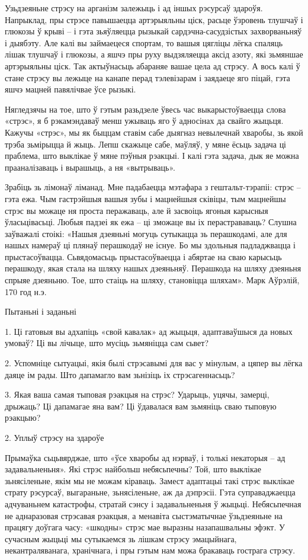 Узьдзеяньне стрэсу на арганізм залежыць і ад іншых рэсурсаў здароўя. Напрыклад, пры стрэсе павышаецца артэрыяльны ціск, расьце ўзровень тлушчаў і глюкозы ў крыві – і гэта зьяўляецца рызыкай сардэчна-сасудзістых захворваньняў і дыябэту. Але калі вы займаецеся спортам, то вашыя цягліцы лёгка спаляць лішак тлушчаў і глюкозы, а яшчэ пры руху выдзяляецца аксід азоту, які зьмяншае артэрыяльны ціск. Так актыўнасьць абараняе вашае цела ад стрэсу. А вось калі ў стане стрэсу вы лежыце на канапе перад тэлевізарам і заядаеце яго піцай, гэта яшчэ мацней павялічвае ўсе рызыкі.

Нягледзячы на тое, што ў гэтым разьдзеле ўвесь час выкарыстоўваецца слова «стрэс», я б рэкамэндаваў менш ужываць яго ў адносінах да свайго жыцьця. Кажучы «стрэс», мы як быццам ставім сабе дыягназ невылечнай хваробы, зь якой трэба зьмірыцца й жыць. Лепш скажыце сабе, маўляў, у мяне ёсьць задача ці праблема, што выклікае ў мяне пэўныя рэакцыі. І калі гэта задача, дык яе можна прааналізаваць і вырашыць, а ня «вытрываць».

Зрабіць зь лімонаў ліманад. Мне падабаецца мэтафара з гештальт-тэрапіі: стрэс – гэта ежа. Чым гастрэйшыя вашыя зубы і мацнейшыя сківіцы, тым мацнейшы стрэс вы можаце ня проста перажаваць, але й засвоіць ягоныя карысныя ўласьцівасьці. Любыя падзеі як ежа – ці зможаце вы іх перастрававаць? Слушна заўважалі стоікі: «Нашыя дзеяньні могуць сутыкацца зь перашкодамі, але для нашых намераў ці плянаў перашкодаў не існуе. Бо мы здольныя падладжвацца і прыстасоўвацца. Сьвядомасьць прыстасоўваецца і абяртае на сваю карысьць перашкоду, якая стала на шляху нашых дзеяньняў. Перашкода на шляху дзеяньня спрыяе дзеяньню. Тое, што стаіць на шляху, становіцца шляхам». Марк Аўрэлій, 170 год н.э.

Пытаньні і заданьні

1. Ці гатовыя вы адхапіць «свой кавалак» ад жыцьця, адаптаваўшыся да новых умоваў? Ці вы лічыце, што мусіць зьмяніцца сам сьвет?

2. Успомніце сытуацыі, якія былі стрэсавымі для вас у мінулым, а цяпер вы лёгка даяце ім рады. Што дапамагло вам зьнізіць іх стрэсагеннасьць?

3. Якая ваша самая тыповая рэакцыя на стрэс? Ударыць, уцячы, замерці, дрыжаць? Ці дапамагае яна вам? Ці ўдавалася вам зьмяніць сваю тыповую рэакцыю?


2. Уплыў стрэсу на здароўе

Прымаўка сьцьвярджае, што «ўсе хваробы ад нэрваў, і толькі некаторыя – ад задавальненьня». Які стрэс найбольш небясьпечны? Той, што выклікае зьнясіленьне, якім мы не можам кіраваць. Замест адаптацыі такі стрэс выклікае страту рэсурсаў, выгараньне, зьнясіленьне, аж да дэпрэсіі. Гэта суправаджаецца адчуваньнем катастрофы, стратай сэнсу і задавальненьня ў жыцьці. Небясьпечная не аднаразовая стрэсавая рэакцыя, а менавіта сыстэматычнае ўзьдзеяньне на працягу доўгага часу: «шкодны» стрэс мае выразны назапашвальны эфэкт. У сучасным жыцьці мы сутыкаемся зь лішкам стрэсу эмацыйнага, некантраляванага, хранічнага, і пры гэтым нам можа бракаваць гострага стрэсу.

